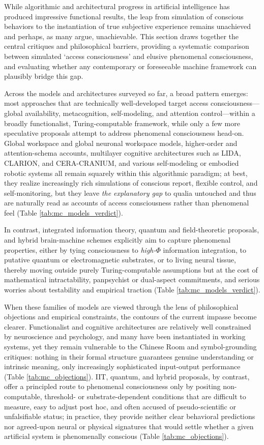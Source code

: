 While algorithmic and architectural progress in artificial intelligence has produced impressive functional results, the leap from simulation of conscious behaviors to the instantiation of true subjective experience remains unachieved and perhaps, as many argue, unachievable. This section draws together the central critiques and philosophical barriers, providing a systematic comparison between simulated `access consciousness' and elusive phenomenal consciousness, and evaluating whether any contemporary or foreseeable machine framework can plausibly bridge this gap.

Across the models and architectures surveyed so far, a broad pattern emerges: most approaches that are technically well-developed target access consciousness---global availability, metacognition, self-modeling, and attention control---within a broadly functionalist, Turing-computable framework, while only a few more speculative proposals attempt to address phenomenal consciousness head-on. Global workspace and global neuronal workspace models, higher-order and attention-schema accounts, multilayer cognitive architectures such as LIDA, CLARION, and CERA-CRANIUM, and various self-modeling or embodied robotic systems all remain squarely within this algorithmic paradigm; at best, they realize increasingly rich simulations of conscious report, flexible control, and self-monitoring, but they leave \emph{the explanatory gap} to qualia untouched and thus are naturally read as accounts of access consciousness rather than phenomenal feel (Table \ref{tab:mc_models_verdict}). 

In contrast, integrated information theory, quantum and field-theoretic proposals, and hybrid brain-machine schemes explicitly aim to capture phenomenal properties, either by tying consciousness to \emph{high-$\Phi$} information integration, to putative quantum or electromagnetic substrates, or to living neural tissue, thereby moving outside purely Turing-computable assumptions but at the cost of mathematical intractability, panpsychist or dual-aspect commitments, and serious worries about testability and empirical traction (Table \ref{tab:mc_models_verdict}).

When these families of models are viewed through the lens of philosophical objections and empirical constraints, the contours of the current impasse become clearer. Functionalist and cognitive architectures are relatively well constrained by neuroscience and psychology, and many have been instantiated in working systems, yet they remain vulnerable to the Chinese Room and symbol-grounding critiques: nothing in their formal structure guarantees genuine understanding or intrinsic meaning, only increasingly sophisticated input-output performance (Table \ref{tab:mc_objections}). IIT, quantum, and hybrid proposals, by contrast, offer a principled route to phenomenal consciousness only by positing non-computable, threshold- or substrate-dependent conditions that are difficult to measure, easy to adjust post hoc, and often accused of pseudo-scientific or unfalsifiable status; in practice, they provide neither clear behavioral predictions nor agreed-upon neural or physical signatures that would settle whether a given artificial system is phenomenally conscious (Table \ref{tab:mc_objections}). 

